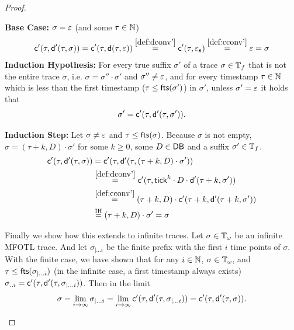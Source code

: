 \begin{proof}
\begin{enumerate}
        \textbf{Base Case:}
        $\sigma = \varepsilon$ (and some $\tau \in \mathbb{N}$)
        \begin{align*}
            \mathsf{c}'(\tau, \mathsf{d}'(\tau, \sigma))
            = \mathsf{c}'(\tau, \mathsf{d}(\tau, \varepsilon))
            \stackrel{\ref{def:dconv'}}{=}
                \mathsf{c}'(\tau, \varepsilon_{\mathbf{s}})
            \stackrel{\ref{def:cconv'}}{=}
                \varepsilon = \sigma
        \end{align*}
        \textbf{Induction Hypothesis:} 
        For every true suffix $\sigma'$ of a trace $\sigma \in \mathbb{T}_f$
        that is not the entire trace $\sigma$, i.e.
        $\sigma = \sigma'' \cdot \sigma'$ and $\sigma'' \neq \varepsilon$,
        and for every timestamp $\tau \in \mathbb{N}$
        which is less than the first timestamp
        ($\tau \leq \mathsf{fts}(\sigma')$)
        in $\sigma'$, unless $\sigma' = \varepsilon$ it holds that
        \begin{equation*}
            \sigma' = \mathsf{c}'(\tau, \mathsf{d}'(\tau, \sigma')).
        \end{equation*}
    
        \textbf{Induction Step:}
        Let $\sigma \neq \varepsilon$
        and $\tau \leq \mathsf{fts}(\sigma)$.
        Because $\sigma$ is not empty,
        $\sigma = \left(\tau+k, D \right) \cdot \sigma'$
        for some $k \geq 0$, some $D \in \mathsf{DB}$ and
        a suffix $\sigma' \in \mathbb{T}_f$.
        \begin{align*}
            \mathsf{c}'(\tau, \mathsf{d}'(\tau, \sigma))
            &= \mathsf{c}'(\tau, \mathsf{d}'(\tau, (\tau+k, D) \cdot \sigma')) \\
            &\stackrel{\ref{def:dconv'}}{=}
                \mathsf{c}'(\tau, \mathsf{tick}^k \cdot D \cdot \mathsf{d}'(\tau + k, \sigma')) \\
            &\stackrel{\ref{def:cconv'}}{=}
                (\tau+k, D) \cdot \mathsf{c}'(\tau+k, \mathsf{d}'(\tau+k, \sigma')) \\
            &\stackrel{\text{IH}}{=} \left(\tau+k, D \right) \cdot \sigma'
            = \sigma
        \end{align*}

        Finally we show how this extends to infinite traces.
        Let $\sigma \in \mathbb{T}_\omega$ be an infinite MFOTL
        trace.
        And let $\sigma_{|\dots i}$ be the finite prefix with the
        first $i$ time points of $\sigma$.
        With the finite case, we have shown that
        for any $i \in \mathbb{N}$, $\sigma \in \mathbb{T}_\omega$,
        and $\tau \leq \mathsf{fts}(\sigma_{|\dots i})$
        (in the infinite case, a first timestamp always exists)
        $ \sigma_{..i} =
            \mathsf{c}'(\tau, \mathsf{d}'(\tau, \sigma_{|\dots i}))$.
        Then in the limit
        \begin{equation*}
            \sigma =
            \lim_{i \to \infty}
            \sigma_{|\dots i} = 
            \lim_{i \to \infty}
            \mathsf{c}'(\tau, \mathsf{d}'(\tau, \sigma_{|\dots i})) =
            \mathsf{c}'(\tau, \mathsf{d}'(\tau, \sigma)).
        \end{equation*}
    

\end{enumerate}
\end{proof}

